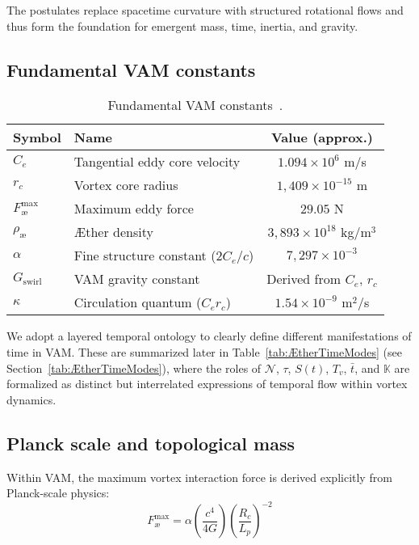 The postulates replace spacetime curvature with structured rotational flows and thus form the foundation for emergent mass, time, inertia, and gravity.

\subsection*{Fundamental VAM constants}

\begin{table}[htbp]
    \centering
    \begin{tabular}{llc}
        \hline
        \toprule
        \textbf{Symbol} & \textbf{Name} & \textbf{Value (approx.)} \\
        \hline
        \midrule
        $C_e$ & Tangential eddy core velocity & $1.094 \times 10^6$ m/s \\
        $r_c$ & Vortex core radius & $1,409 \times 10^{-15}$ m \\
        $F^{\text{max}}_{\text{\ae}}$ & Maximum eddy force & $29.05$ N \\
        $\rho_\text{\ae}$ & Æther density & $3,893 \times 10^{18}$ kg/m$^3$ \\
        $\alpha$ & Fine structure constant ($2 C_e/c$) & $7,297 \times 10^{-3}$\\
        $G_\text{swirl}$ & VAM gravity constant & Derived from $C_e$, $r_c$\\
        $\kappa$ & Circulation quantum ($C_e r_c$) & $1.54 \times 10^{-9}$ m$^2$/s \\
        \hline
        \bottomrule
    \end{tabular}
    \caption{Fundamental VAM constants~\cite{vam2025field}.}
    \label{tab:VAMconstants}
\end{table}

We adopt a layered temporal ontology to clearly define different manifestations of time in VAM. These are summarized later in Table~\ref{tab:ÆtherTimeModes} (see Section~\ref{tab:ÆtherTimeModes}), where the roles of $\mathcal{N}$, $\tau$, $S(t)$, $T_v$, $\bar{t}$, and $\mathbb{K}$ are formalized as distinct but interrelated expressions of temporal flow within vortex dynamics.


\subsection*{Planck scale and topological mass}

Within VAM, the maximum vortex interaction force is derived explicitly from Planck-scale physics:
\begin{equation}
    F^{\text{max}}_{\text{\ae}} = \alpha  \left(\frac{c^4}{4G}\right) \left(\frac{R_c}{L_p}\right)^{-2}
\end{equation}

